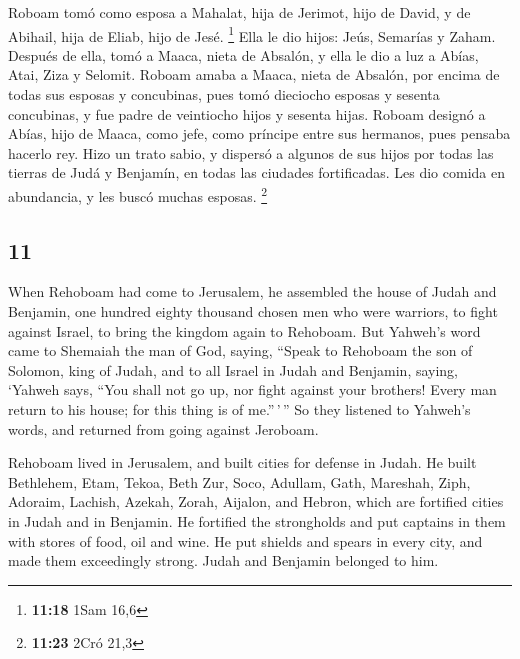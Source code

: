 \begin{paracol}{2}
 Roboam tomó como esposa a Mahalat, hija de Jerimot, hijo
de David, y de Abihail, hija de Eliab, hijo de Jesé. \footnote{\textbf{11:18}
  1Sam 16,6}  Ella le dio hijos: Jeús, Semarías y Zaham.
 Después de ella, tomó a Maaca, nieta de Absalón, y ella
le dio a luz a Abías, Atai, Ziza y Selomit.  Roboam amaba
a Maaca, nieta de Absalón, por encima de todas sus esposas y concubinas,
pues tomó dieciocho esposas y sesenta concubinas, y fue padre de
veintiocho hijos y sesenta hijas.  Roboam designó a
Abías, hijo de Maaca, como jefe, como príncipe entre sus hermanos, pues
pensaba hacerlo rey.  Hizo un trato sabio, y dispersó a
algunos de sus hijos por todas las tierras de Judá y Benjamín, en todas
las ciudades fortificadas. Les dio comida en abundancia, y les buscó
muchas esposas. \footnote{\textbf{11:23} 2Cró 21,3}

\switchcolumn
\begin{otherlanguage}{english}

\hypertarget{section-21}{%
\section{11}\label{section-21}}

 When Rehoboam had come to Jerusalem, he assembled the
house of Judah and Benjamin, one hundred eighty thousand chosen men who
were warriors, to fight against Israel, to bring the kingdom again to
Rehoboam.  But Yahweh's word came to Shemaiah the man of
God, saying,  ``Speak to Rehoboam the son of Solomon, king
of Judah, and to all Israel in Judah and Benjamin, saying,
 `Yahweh says, ``You shall not go up, nor fight against
your brothers! Every man return to his house; for this thing is of
me.''\,'\,'' So they listened to Yahweh's words, and returned from going
against Jeroboam.

 Rehoboam lived in Jerusalem, and built cities for defense
in Judah.  He built Bethlehem, Etam, Tekoa, 
Beth Zur, Soco, Adullam,  Gath, Mareshah, Ziph,
 Adoraim, Lachish, Azekah,  Zorah, Aijalon,
and Hebron, which are fortified cities in Judah and in Benjamin.
 He fortified the strongholds and put captains in them
with stores of food, oil and wine.  He put shields and
spears in every city, and made them exceedingly strong. Judah and
Benjamin belonged to him.


\end{otherlanguage}
\end{paracol}
